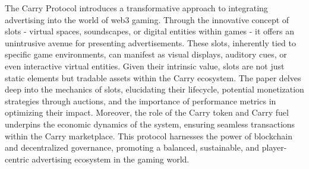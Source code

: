 \documentclass[
10pt, %
a4paper, %
oneside, %
headinclude,footinclude, %
BCOR5mm, %
]{scrartcl}
\begin{document}
The Carry Protocol introduces a transformative approach to integrating advertising into the world of web3 gaming. Through the innovative concept of slots - virtual spaces, soundscapes, or digital entities within games - it offers an unintrusive avenue for presenting advertisements. These slots, inherently tied to specific game environments, can manifest as visual displays, auditory cues, or even interactive virtual entities. Given their intrinsic value, slots are not just static elements but tradable assets within the Carry ecosystem. The paper delves deep into the mechanics of slots, elucidating their lifecycle, potential monetization strategies through auctions, and the importance of performance metrics in optimizing their impact. Moreover, the role of the Carry token and Carry fuel underpins the economic dynamics of the system, ensuring seamless transactions within the Carry marketplace. This protocol harnesses the power of blockchain and decentralized governance, promoting a balanced, sustainable, and player-centric advertising ecosystem in the gaming world.






\newpage %












% 

\end{document}
